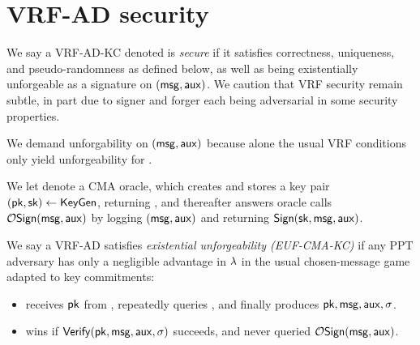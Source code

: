 
\section{VRF-AD security}
\label{sec:games}

We say a VRF-AD-KC denoted \VRF is {\em secure} if it satisfies
 correctness, uniqueness, and pseudo-randomness as defined below,
 as well as being existentially unforgeable as a signature on $(\mathsf{msg},\mathsf{aux})$.
%
We caution that VRF security remain subtle, in part due to
signer and forger each being adversarial in some security properties.
%


We demand unforgability on $(\mathsf{msg},\mathsf{aux})$ because alone
the usual VRF conditions only yield unforgeability for \msg.

\begin{definition}\label{def:vrf_sign_oracle}
We let  denote a CMA oracle, which creates and stores
a key pair $(\mathsf{pk},\mathsf{sk}) \leftarrow {\ensuremath{\mathsf{KeyGen}}}$, returning \pk, and
thereafter answers oracle calls $\mathcal{O}\mathsf{Sign}(\mathsf{msg},\mathsf{aux})$ by 
logging $(\mathsf{msg},\mathsf{aux})$ and returning ${\mathsf{Sign}}(\mathsf{sk},\mathsf{msg},\mathsf{aux})$.
\end{definition}

\begin{definition}
We say a VRF-AD satisfies {\em existential unforgeability (EUF-CMA-KC)} if
any PPT adversary \adv has only a negligible advantage in $\lambda$
in the usual chosen-message game adapted to key commitments:
\begin{itemize}
  \item \adv receives $\mathsf{pk}$ from , %
  repeatedly queries ,
  and finally produces $\mathsf{pk},\mathsf{msg},\mathsf{aux},\sigma$.
  \item \adv wins if ${\mathsf{Verify}}(\mathsf{pk},\mathsf{msg},\mathsf{aux},\sigma)$ succeeds, and
  \adv never queried $\mathcal{O}\mathsf{Sign}(\mathsf{msg},\mathsf{aux})$.
\end{itemize}
\end{definition}


